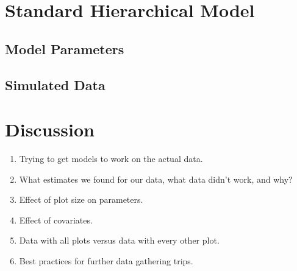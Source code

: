 \documentclass{article}
\begin{document}
    \section{Standard Hierarchical Model}
        \subsection{Model Parameters}
        \subsection{Simulated Data}
    \section{Discussion}
    \begin{enumerate}
        \item Trying to get models to work on the actual data.
        \item What estimates we found for our data, what data didn't work, and
        why?
        \item Effect of plot size on parameters.
        \item Effect of covariates.
        \item Data with all plots versus data with every other plot.
        \item Best practices for further data gathering trips.
    \end{enumerate}
\end{document}
